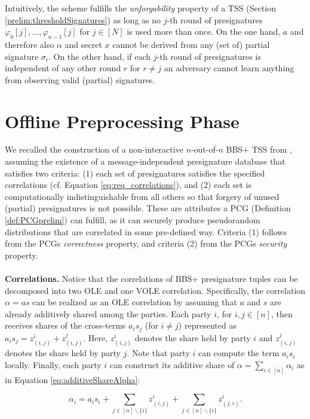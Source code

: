 Intuitively, the scheme fulfills the \textit{unforgability} property of a TSS (Section \ref{prelim:thresholdSignatures}) as long as no $j$-th round of presignatures $\varphi_{0}[j], \ldots, \varphi_{n-1}[j]$ for $j \in [N]$  is used more than once. On the one hand, $a$ and therefore also $\alpha$ and secret $x$ cannot be derived from any (set of) partial signature $\sigma_i$. On the other hand, if each $j$-th round of presignatures is independent of any other round $r$ for $r \neq j$ an adversary cannot learn anything from observing valid (partial) signatures.

\section{Offline Preprocessing Phase}
We recalled the construction of a non-interactive $n$-out-of-$n$ BBS+ TSS from \cite{cryptoeprint:2023/1076}, assuming the existence of a message-independent presignature database that satisfies two criteria: (1) each set of presignatures satisfies the specified correlations (cf. Equation \ref{eq:req_correlations}), and (2) each set is computationally indistinguishable from all others so that forgery of unused (partial) presignatures is not possible. These are attributes a PCG (Definition \ref{def:PCGprelim}) can fulfill, as it can securely produce pseudorandom distributions that are correlated in some pre-defined way. Criteria (1) follows from the PCGs \textit{correctness} property, and criteria (2) from the PCGs \textit{security} property.
\\\\
\textbf{Correlations.} Notice that the correlations of BBS+ presignature tuples can be decomposed into two OLE and one VOLE correlation. Specifically, the correlation $\alpha = as$ can be realized as an OLE correlation by assuming that $a$ and $s$ are already additively shared among the parties. Each party $i$, for $i, j \in [n]$, then receives shares of the cross-terms $a_is_j$ (for $i \neq j$) represented as  $a_is_j = z_{(i,j)}^i+z_{(i,j)}^j$. Here, $z_{(i,j)}^i$ denotes the share held by party $i$ and $z_{(i,j)}^j$ denotes the share held by party $j$. Note that party $i$ can compute the term $a_is_i$ locally. Finally, each party $i$ can construct its additive share of $\alpha = \sum_{i\in [n]}\alpha_i$ as in Equation \ref{eq:additiveShareAlpha}:

\begin{equation}
  \alpha_i=a_is_i + \sum_{j \in [n]\backslash \{i\}}{z_{(i,j)}^i} + \sum_{j \in [n]\backslash \{i\}}z_{(j,i)}^i.
  \label{eq:additiveShareAlpha}
\end{equation}

